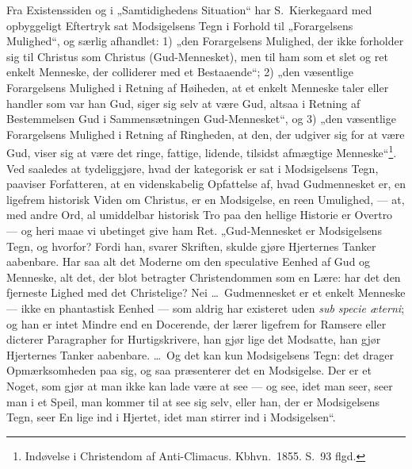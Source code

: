 \documentclass[12pt]{book}
\begin{document}
Fra Existenssiden og i „Samtidighedens Situation“ har
S.\ Kierkegaard med opbyggeligt Eftertryk sat Modsigelsens Tegn i
Forhold til „Forargelsens Mulighed“, og særlig afhandlet: 1) „den
Forargelsens Mulighed, der ikke forholder sig til Christus som
Christus (Gud-Mennesket), men til ham som et slet og ret enkelt
Menneske, der colliderer med et Bestaaende“; 2) „den væsentlige
Forargelsens Mulighed i Retning af Høiheden, at et enkelt Menneske
taler eller handler som var han Gud, siger sig selv at være Gud,
altsaa i Retning af Bestemmelsen Gud i Sammensætningen
Gud-Mennesket“, og 3) „den væsentlige Forargelsens Mulighed i
Retning af Ringheden, at den, der udgiver sig for at være Gud, viser
sig at være
det ringe, fattige, lidende, tilsidst afmægtige
Menneske“\footnote{Indøvelse i Christendom af Anti-Climacus.
Kbhvn.\ 1855. S.\ 93 flgd.}.
Ved saaledes at tydeliggjøre, hvad
der kategorisk er sat i Modsigelsens Tegn, paaviser Forfatteren, at
en videnskabelig Opfattelse af, hvad Gudmennesket er, en ligefrem
historisk Viden om Christus, er en Modsigelse, en reen Umulighed,
--- at, med andre Ord, al umiddelbar historisk Tro paa den hellige
Historie er Overtro --- og heri maae vi ubetinget give ham Ret.
„Gud-Mennesket er Modsigelsens Tegn, og hvorfor? Fordi han, svarer
Skriften, skulde gjøre Hjerternes Tanker aabenbare. Har saa alt det
Moderne om den speculative Eenhed af Gud og Menneske, alt det, der
blot betragter Christendommen som en Lære: har det den fjerneste
Lighed med det Christelige? Nei \dots\ Gudmennesket er et enkelt
Menneske --- ikke en phantastisk Eenhed --- som aldrig har existeret
uden \textit{sub specie æterni}; og han er intet Mindre end en
Docerende, der lærer ligefrem for Ramsere eller dicterer Paragrapher
for Hurtigskrivere, han gjør lige det Modsatte, han gjør Hjerternes
Tanker aabenbare. \dots\ Og det kan kun Modsigelsens Tegn: det
drager Opmærksomheden paa sig, og saa præsenterer det en Modsigelse.
Der er et Noget, som gjør at man ikke kan lade være at see --- og
see, idet man seer, seer man i et Speil, man kommer til at see sig
selv, eller han, der er Modsigelsens Tegn, seer En lige ind i
Hjertet, idet man stirrer ind i Modsigelsen“.
\end{document}

